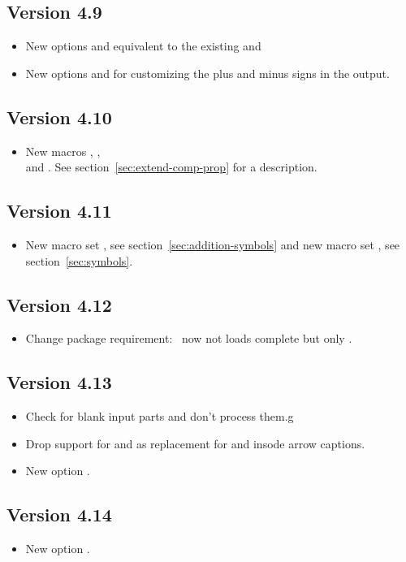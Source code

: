 \documentclass[load-preamble+]{cnltx-doc}
\begin{document}
\subsection{Version 4.9}
\begin{itemize}
  \item New options  and  equivalent
    to the existing  and 
  \item New options  and
     for customizing the plus and minus signs in
    the output.
\end{itemize}

\subsection{Version 4.10}
\begin{itemize}
  \item New macros ,
    , \\
     and .  See
    section~\ref{sec:extend-comp-prop} for a description.
\end{itemize}

\subsection{Version 4.11}
\begin{itemize}
  \item New macro set , see
    section~\ref{sec:addition-symbols}  and new macro set ,
    see section~\ref{sec:symbols}.
\end{itemize}

\subsection{Version 4.12}
\begin{itemize}
  \item Change package requirement: \chemformula\ now not loads complete
     but only .
\end{itemize}

\subsection{Version 4.13}
\begin{itemize}
  \item Check for blank input parts and don't process them.g
  \item Drop support for \cs*{[} and \cs*{]} as replacement for \code{[} and
    \code{]} insode arrow captions.
  \item New option .
\end{itemize}

\subsection{Version 4.14}
\begin{itemize}
  \item New option .
\end{itemize}
\end{document}
